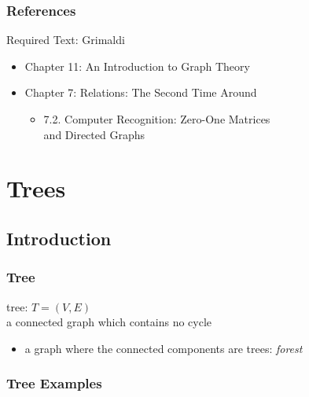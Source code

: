 \documentclass[dvipsnames]{beamer}
\begin{document}
\begin{frame}
  \frametitle{References}

  \begin{block}{Required Text: Grimaldi}
    \begin{itemize}
      \item Chapter 11: \alert{An Introduction to Graph Theory}

      \item Chapter 7: Relations: The Second Time Around
      \begin{itemize}
        \item 7.2. \alert{Computer Recognition: Zero-One Matrices\\
                          and Directed Graphs}
      \end{itemize}
    \end{itemize}
  \end{block}
\end{frame}

\section{Trees}

\subsection{Introduction}

\begin{frame}
  \frametitle{Tree}

  \begin{definition}
    \alert{tree}: $T=(V,E)$\\
    a connected graph which contains no cycle
  \end{definition}

  \pause
  \begin{itemize}
    \item a graph where the connected components are trees: \emph{forest}
  \end{itemize}
\end{frame}

\begin{frame}
  \frametitle{Tree Examples}

  \begin{example}
    \begin{center}
    \end{center}
  \end{example}
\end{frame}
\end{document}
